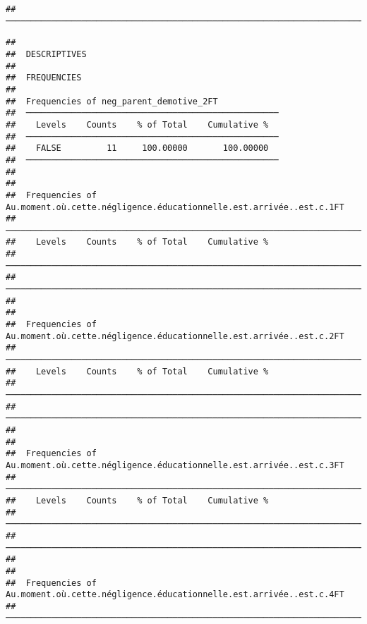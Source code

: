 \documentclass[
]{article}
\begin{document}
\begin{verbatim}
##  ─────────────────────────────────────────────────────────────────────────────────────────────────────────────────────────────────────────────────────────────────────────────────────────────────────────────────────────────────────────────────────────────────────────────────────────────────────────────────────────────────────────────────────────────────────────────────────────────────────────────────────────────────────────────────────────────────────────────────────────────────────────────────────────────────────────────────────────────────────────────────────────────────────────────────────────────────────────────────────────────────────────────────
\end{verbatim}

\begin{verbatim}
## 
##  DESCRIPTIVES
## 
##  FREQUENCIES
## 
##  Frequencies of neg_parent_demotive_2FT             
##  ────────────────────────────────────────────────── 
##    Levels    Counts    % of Total    Cumulative %   
##  ────────────────────────────────────────────────── 
##    FALSE         11     100.00000       100.00000   
##  ────────────────────────────────────────────────── 
## 
## 
##  Frequencies of Au.moment.où.cette.négligence.éducationnelle.est.arrivée..est.c.1FT 
##  ────────────────────────────────────────────────────────────────────────────────── 
##    Levels    Counts    % of Total    Cumulative %   
##  ────────────────────────────────────────────────────────────────────────────────── 
##  ────────────────────────────────────────────────────────────────────────────────── 
## 
## 
##  Frequencies of Au.moment.où.cette.négligence.éducationnelle.est.arrivée..est.c.2FT 
##  ────────────────────────────────────────────────────────────────────────────────── 
##    Levels    Counts    % of Total    Cumulative %   
##  ────────────────────────────────────────────────────────────────────────────────── 
##  ────────────────────────────────────────────────────────────────────────────────── 
## 
## 
##  Frequencies of Au.moment.où.cette.négligence.éducationnelle.est.arrivée..est.c.3FT 
##  ────────────────────────────────────────────────────────────────────────────────── 
##    Levels    Counts    % of Total    Cumulative %   
##  ────────────────────────────────────────────────────────────────────────────────── 
##  ────────────────────────────────────────────────────────────────────────────────── 
## 
## 
##  Frequencies of Au.moment.où.cette.négligence.éducationnelle.est.arrivée..est.c.4FT 
##  ────────────────────────────────────────────────────────────────────────────────── 

\end{verbatim}
\end{document}
